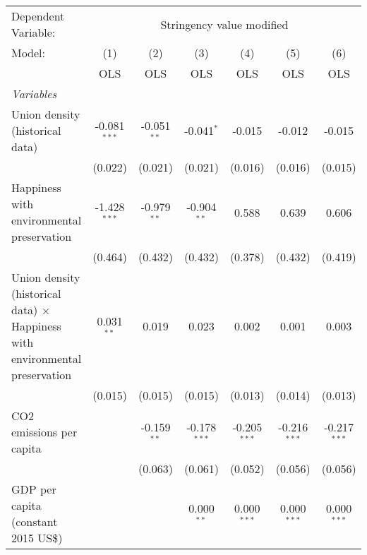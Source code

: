 
\begingroup
\centering
\begin{tabular}{lcccccc}
   \toprule
   Dependent Variable: & \multicolumn{6}{c}{Stringency value modified}\\
   Model:                                                                              & (1)            & (2)           & (3)            & (4)            & (5)            & (6)\\  
                                                                                       &  OLS           & OLS           & OLS            & OLS            & OLS            & OLS\\  
   \midrule
   \emph{Variables}\\
   Union density (historical data)                                                     & -0.081$^{***}$ & -0.051$^{**}$ & -0.041$^{*}$   & -0.015         & -0.012         & -0.015\\   
                                                                                       & (0.022)        & (0.021)       & (0.021)        & (0.016)        & (0.016)        & (0.015)\\   
   Happiness with environmental preservation                                           & -1.428$^{***}$ & -0.979$^{**}$ & -0.904$^{**}$  & 0.588          & 0.639          & 0.606\\   
                                                                                       & (0.464)        & (0.432)       & (0.432)        & (0.378)        & (0.432)        & (0.419)\\   
   Union density (historical data) $\times$ Happiness with environmental preservation  & 0.031$^{**}$   & 0.019         & 0.023          & 0.002          & 0.001          & 0.003\\   
                                                                                       & (0.015)        & (0.015)       & (0.015)        & (0.013)        & (0.014)        & (0.013)\\   
   CO2 emissions per capita                                                            &                & -0.159$^{**}$ & -0.178$^{***}$ & -0.205$^{***}$ & -0.216$^{***}$ & -0.217$^{***}$\\   
                                                                                       &                & (0.063)       & (0.061)        & (0.052)        & (0.056)        & (0.056)\\   
   GDP per capita (constant 2015 US\$)                                                 &                &               & 0.000$^{**}$   & 0.000$^{***}$  & 0.000$^{***}$  & 0.000$^{***}$\\   

\end{tabular}
